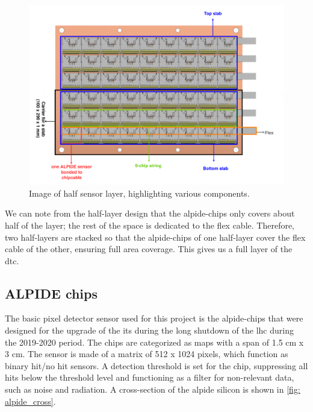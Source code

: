 \documentclass[main.tex]{subfiles}
\begin{document}
\begin{figure}[!ht]
    \centering
    \includegraphics[scale = 0.4]{images/half_tea.png}
    \caption{Image of half sensor layer, highlighting various components.\cite{Tea}}
    \label{fig: half_layer}
\end{figure}


We can note from the half-layer design that the \gls{alpide}-chips only covers about half of the layer; the rest of the space is dedicated to the flex cable. Therefore, two half-layers are stacked so that the \gls{alpide}-chips of one half-layer cover the flex cable of the other, ensuring full area coverage. This gives us a full layer of the \gls{dtc}.


\subsection{ALPIDE chips}

The basic pixel detector sensor used for this project is the \gls{alpide}-chips that were designed for the upgrade of the \gls{its} during the long shutdown of the \gls{lhc} during the 2019-2020 period. The chips are categorized as \gls{maps} with a span of 1.5 cm x 3 cm. The sensor is made of a matrix of 512 x 1024 pixels, which function as binary hit/no hit sensors. A detection threshold is set for the chip, suppressing all hits below the threshold level and functioning as a filter for non-relevant data, such as noise and radiation. A cross-section of the \gls{alpide} silicon is shown in \autoref{fig: alpide_cross}.
\end{document}
